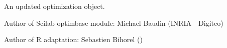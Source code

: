 %
\begin{Value}
An updated optimization object.
\end{Value}
%
\begin{Author}\relax
Author of Scilab optimbase module: Michael Baudin (INRIA - Digiteo)

Author of R adaptation: Sebastien Bihorel ()
\end{Author}
%
\begin{SeeAlso}\relax
{}
\end{SeeAlso}
